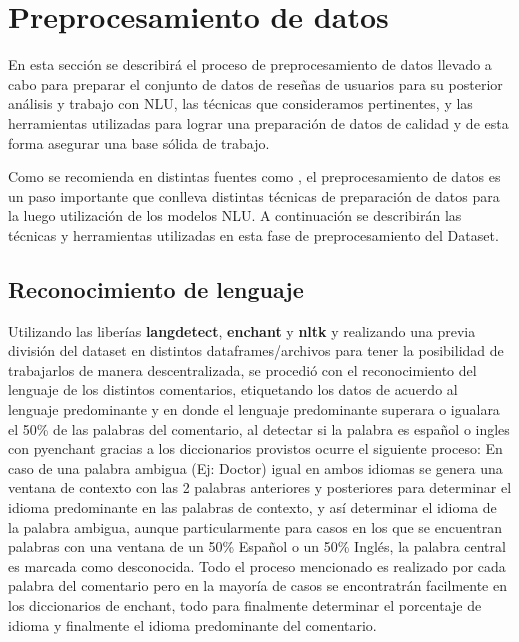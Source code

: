 \chapter{\textbf{Preprocesamiento de datos}}
\label{cha:preprocesamiento_datos}

En esta sección se describirá el proceso de preprocesamiento de datos llevado a cabo para preparar el conjunto de datos de reseñas de usuarios para su posterior análisis y trabajo con NLU, las técnicas que consideramos pertinentes, y las herramientas utilizadas para lograr una preparación de datos de calidad y de esta forma asegurar una base sólida de trabajo.

Como se recomienda en distintas fuentes como \cite{Agrawal2024TextPreprocessing}, el preprocesamiento de datos es un paso importante que conlleva distintas técnicas de preparación de datos para la luego utilización de los modelos NLU. A continuación se describirán las técnicas y herramientas utilizadas en esta fase de preprocesamiento del Dataset.


\section{\textbf{Reconocimiento de lenguaje}} %
Utilizando las liberías \textbf{langdetect}, \textbf{enchant} y \textbf{nltk} y realizando una previa división del dataset en distintos dataframes/archivos para tener la posibilidad de trabajarlos de manera descentralizada, se procedió con el reconocimiento del lenguaje de los distintos comentarios, etiquetando los datos de acuerdo al lenguaje predominante y en donde el lenguaje predominante superara o igualara el 50\% de las palabras del comentario, al detectar si la palabra es español o ingles con pyenchant gracias a los diccionarios provistos ocurre el siguiente proceso: En caso de una palabra ambigua (Ej: Doctor) igual en ambos idiomas se genera una ventana de contexto con las 2 palabras anteriores y posteriores para determinar el idioma predominante en las palabras de contexto, y así determinar el idioma de la palabra ambigua, aunque particularmente para casos en los que se encuentran palabras con una ventana de un 50\% Español o un 50\% Inglés, la palabra central es marcada como desconocida. Todo el proceso mencionado es realizado por cada palabra del comentario pero en la mayoría de casos se encontratrán facilmente en los diccionarios de enchant, todo para finalmente determinar el porcentaje de idioma y finalmente el idioma predominante del comentario.

